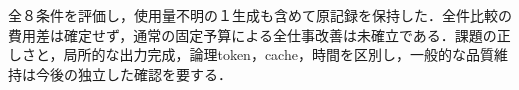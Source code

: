 全８条件を評価し，使用量不明の１生成も含めて原記録を保持した．全件比較の費用差は確定せず，通常の固定予算による全仕事改善は未確立である．課題の正しさと，局所的な出力完成，論理token，cache，時間を区別し，一般的な品質維持は今後の独立した確認を要する．

